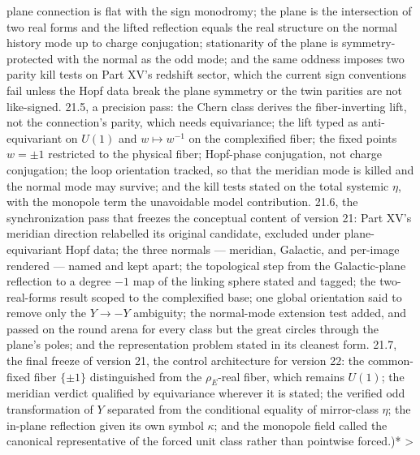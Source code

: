 plane connection is flat with the sign monodromy; the plane is the intersection of two real forms and the lifted reflection equals the real structure on the normal history mode up to charge conjugation; stationarity of the plane is symmetry-protected with the normal as the odd mode; and the same oddness imposes two parity kill tests on Part XV's redshift sector, which the current sign conventions fail unless the Hopf data break the plane symmetry or the twin parities are not like-signed. 21.5, a precision pass: the Chern class derives the fiber-inverting lift, not the connection's parity, which needs equivariance; the lift typed as anti-equivariant on $U(1)$ and $w\mapsto w^{-1}$ on the complexified fiber; the fixed points $w = \pm1$ restricted to the physical fiber; Hopf-phase conjugation, not charge conjugation; the loop orientation tracked, so that the meridian mode is killed and the normal mode may survive; and the kill tests stated on the total systemic $\eta$, with the monopole term the unavoidable model contribution. 21.6, the synchronization pass that freezes the conceptual content of version 21: Part XV's meridian direction relabelled its original candidate, excluded under plane-equivariant Hopf data; the three normals — meridian, Galactic, and per-image rendered — named and kept apart; the topological step from the Galactic-plane reflection to a degree $-1$ map of the linking sphere stated and tagged; the two-real-forms result scoped to the complexified base; one global orientation said to remove only the $Y\to-Y$ ambiguity; the normal-mode extension test added, and passed on the round arena for every class but the great circles through the plane's poles; and the representation problem stated in its cleanest form. 21.7, the final freeze of version 21, the control architecture for version 22: the common-fixed fiber $\{\pm1\}$ distinguished from the $\rho_E$-real fiber, which remains $U(1)$; the meridian verdict qualified by equivariance wherever it is stated; the verified odd transformation of $Y$ separated from the conditional equality of mirror-class $\eta$; the in-plane reflection given its own symbol $\kappa$; and the monopole field called the canonical representative of the forced unit class rather than pointwise forced.)*
>
